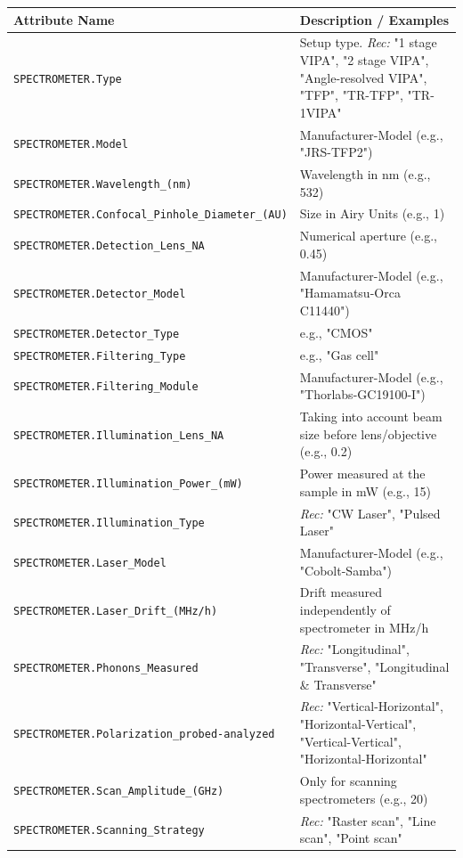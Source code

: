\documentclass{article}
\begin{document}
\begin{longtable}{p{8cm} p{7.5cm}}
\toprule
\textbf{Attribute Name} & \textbf{Description / Examples} \\
\midrule
\texttt{SPECTROMETER.Type} & Setup type. \textit{Rec:} "1 stage VIPA", "2 stage VIPA", "Angle-resolved VIPA", "TFP", "TR-TFP", "TR-1VIPA" \\
\texttt{SPECTROMETER.Model} & Manufacturer-Model (e.g., "JRS-TFP2") \\
\texttt{SPECTROMETER.Wavelength\_(nm)} & Wavelength in nm (e.g., 532) \\
\texttt{SPECTROMETER.Confocal\_Pinhole\_Diameter\_(AU)} & Size in Airy Units (e.g., 1) \\
\texttt{SPECTROMETER.Detection\_Lens\_NA} & Numerical aperture (e.g., 0.45) \\
\texttt{SPECTROMETER.Detector\_Model} & Manufacturer-Model (e.g., "Hamamatsu-Orca C11440") \\
\texttt{SPECTROMETER.Detector\_Type} & e.g., "CMOS" \\
\texttt{SPECTROMETER.Filtering\_Type} & e.g., "Gas cell" \\
\texttt{SPECTROMETER.Filtering\_Module} & Manufacturer-Model (e.g., "Thorlabs-GC19100-I") \\
\texttt{SPECTROMETER.Illumination\_Lens\_NA} & Taking into account beam size before lens/objective (e.g., 0.2) \\
\texttt{SPECTROMETER.Illumination\_Power\_(mW)} & Power measured at the sample in mW (e.g., 15) \\
\texttt{SPECTROMETER.Illumination\_Type} & \textit{Rec:} "CW Laser", "Pulsed Laser" \\
\texttt{SPECTROMETER.Laser\_Model} & Manufacturer-Model (e.g., "Cobolt-Samba") \\
\texttt{SPECTROMETER.Laser\_Drift\_(MHz/h)} & Drift measured independently of spectrometer in MHz/h \\
\texttt{SPECTROMETER.Phonons\_Measured} & \textit{Rec:} "Longitudinal", "Transverse", "Longitudinal \& Transverse" \\
\texttt{SPECTROMETER.Polarization\_probed-analyzed} & \textit{Rec:} "Vertical-Horizontal", "Horizontal-Vertical", "Vertical-Vertical", "Horizontal-Horizontal" \\
\texttt{SPECTROMETER.Scan\_Amplitude\_(GHz)} & Only for scanning spectrometers (e.g., 20) \\
\texttt{SPECTROMETER.Scanning\_Strategy} & \textit{Rec:} "Raster scan", "Line scan", "Point scan" \\

\end{longtable}
\end{document}
